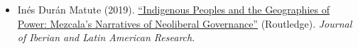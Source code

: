 \begin{itemize}
	\item[\textcolor{gray}{\textbullet}] In\'es Dur\'an Matute (2019). \href{https://doi.org/10.1080/13260219.2019.1671679}{``Indigenous Peoples and the Geographies of Power: Mezcala's Narratives of Neoliberal Governance''} (Routledge). \emph{Journal of Iberian and Latin American Research}. %
\end{itemize}






